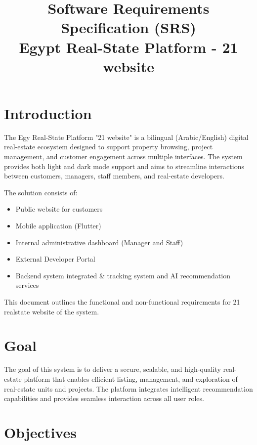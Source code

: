 \documentclass[12pt]{article}
\title{\textbf{Software Requirements Specification (SRS)} \\ Egypt Real-State Platform - 21 website}
\author{}
\date{}
\begin{document}
\maketitle
\onehalfspacing

\section{Introduction}

The Egy Real-State Platform "21 website" is a bilingual (Arabic/English) digital real-estate ecosystem designed to support property browsing, project management, and customer engagement across multiple interfaces. The system provides both light and dark mode support and aims to streamline interactions between customers, managers, staff members, and real-estate developers.

The solution consists of:
\begin{itemize}
    \item Public website for customers
    \item Mobile application (Flutter)
    \item Internal administrative dashboard (Manager and Staff)
    \item External Developer Portal
    \item Backend system integrated \& tracking system and AI recommendation services
\end{itemize}

This document outlines the functional and non-functional requirements for 21 realstate website of the system.

\section{Goal}

The goal of this system is to deliver a secure, scalable, and high-quality real-estate platform that enables efficient listing, management, and exploration of real-estate units and projects. The platform integrates intelligent recommendation capabilities and provides seamless interaction across all user roles.

\section{Objectives}
\end{document}
